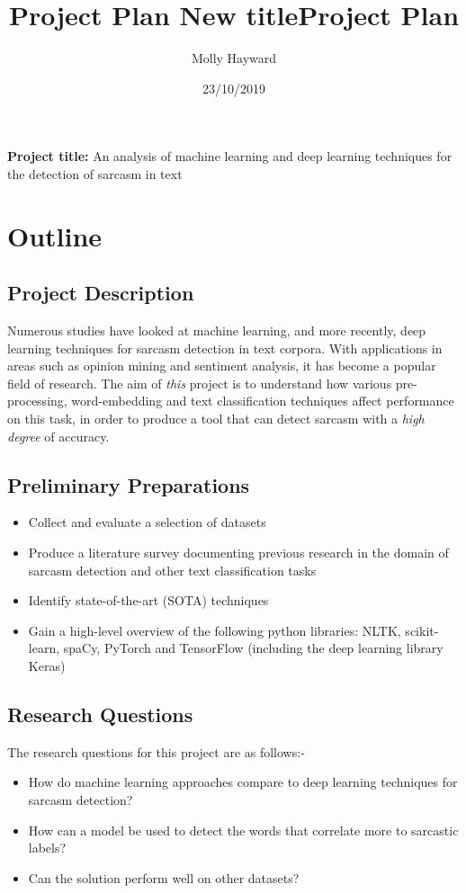 \documentclass[12pt,a4paper]{article}
\title{Project Plan \large \newline 
New title}
\title{Project Plan}
\author{Molly Hayward}
\date{23/10/2019}
\begin{document}
\maketitle

\noindent \textbf{Project title:} An analysis of machine learning and deep learning techniques for the detection of sarcasm in text

\section{Outline}
\subsection{Project Description}
\noindent Numerous studies have looked at machine learning, and more recently, deep learning  techniques for sarcasm detection in text corpora. With applications in areas such as opinion mining and sentiment analysis, it has become a popular field of research. The aim of \textit{this} project is to understand how various pre-processing, word-embedding and text classification techniques affect performance on this task, in order to produce a tool that can detect sarcasm with a \textit{high degree} of accuracy.\\

\subsection{Preliminary Preparations}
\begin{itemize}
	\setlength\itemsep{0em}
	\item Collect and evaluate a selection of datasets
	\item Produce a literature survey documenting previous research in the domain of sarcasm detection and other text classification tasks
	\item Identify state-of-the-art (SOTA) techniques
	\item Gain a high-level overview of the following python libraries: NLTK, scikit-learn, spaCy, PyTorch and TensorFlow (including the deep learning library Keras)
\end{itemize}
\subsection{Research Questions}
The research questions for this project are as follows:-
\begin{itemize}
	\setlength\itemsep{0em}
	\item How do machine learning approaches compare to deep learning techniques for sarcasm detection?
	\item How can a model be used to detect the words that correlate more to sarcastic labels?
	\item Can the solution perform well on other datasets?
\end{itemize}
\end{document}
